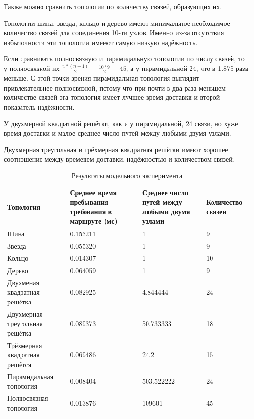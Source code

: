 \documentclass[oneside, draft, 14pt, a4paper]{extreport}
\begin{document}
Также можно сравнить топологии по количеству связей, образующих их.

Топологии шина, звезда, кольцо и дерево имеют минимальное необходимое количество связей для сооединения 10-ти узлов. Именно из-за отсутствия избыточности эти топологии имееют самую низкую надёжность.

Если сравнивать полносвязную и пирамидальную топологии по числу связей, то у полносвязной их \( \frac{ n * (n - 1) }{2} = \frac{10 * 9}{2} = 45 \), а у пирамидальной 24, что в 1.875 раза меньше. С этой точки зрения пирамидальная топология выглядит привлекательнее полносвязной, потому что при почти в два раза меньшем количестве связей эта топология имеет лучшее время доставки и второй показатель надёжности.

У двухмерной квадратной решётки, как и у пирамидальной, 24 связи, но хуже время доставки и малое среднее число путей между любыми двумя узлами. 

Двухмерная треугольная и трёхмерная квадратная решётки имеют хорошее соотношение между временем доставки, надёжностью и количеством связей.

\begin{table}[h!]
	\begin{tabular}{|p{}|p{}|p{}|p{}|}
	\hline Топология & Среднее время пребывания требования в маршруте (мс) & Среднее число путей между любыми двумя узлами & Количество связей \\
	\hline Шина  & 0.153211 & 1 & 9 \\
	\hline Звезда & 0.055320 & 1 & 9 \\
	\hline Кольцо & 0.014307 & 1 & 10 \\
	\hline Дерево & 0.064059 & 1 & 9 \\
	\hline Двухменая квадратная решётка & 0.082925 & 4.844444 & 24 \\
	\hline Двухмерная треугольная решётка & 0.089373 & 50.733333 & 18 \\
	\hline Трёхмерная квадратная решётся & 0.069486 & 24.2 & 15 \\
	\hline Пирамидальная топология & 0.008404 & 503.522222 & 24 \\
	\hline Полносвязная топология & 0.013876 & 109601 & 45 \\
	\hline
	\end{tabular}
	
	\caption{Результаты модельного эксперимента}
	\label{tab:modeling_result}
\end{table}
\end{document}

